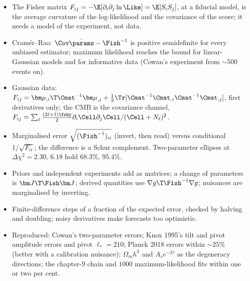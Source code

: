 \begin{recap}
\begin{itemize}
  \item The Fisher matrix $F_{ij}=-\E[\partial_i\partial_j\ln\Like]=\E[S_iS_j]$, at a fiducial model, is the average curvature of the
        log-likelihood and the covariance of the score; it needs a model of the experiment, not data.
  \item Cram\'er--Rao: $\Cov\hat\params-\Fish^{-1}$ is positive semidefinite for every unbiased estimator; maximum likelihood reaches
        the bound for linear-Gaussian models and for informative data (Cowan's experiment from $\sim500$ events on).
  \item Gaussian data: $F_{ij}=\bm\mu_{,i}\T\Cmat^{-1}\bm\mu_{,j}+\frac12\Tr[\Cmat^{-1}\Cmat_{,i}\Cmat^{-1}\Cmat_{,j}]$, first derivatives only; the CMB is the
        covariance channel, $F_{ij}=\sum_\ell\frac{(2\ell+1)\fsky}2\partial_i\Cell\partial_j\Cell/(\Cell+N_\ell)^2$.
  \item Marginalised error $\sqrt{(\Fish^{-1})_{ii}}$ (invert, then read) versus conditional $1/\sqrt{F_{ii}}$; the difference is a Schur
        complement. Two-parameter ellipses at $\Delta\chi^2=2.30,\,6.18$ hold $68.3\%$, $95.4\%$.
  \item Priors and independent experiments add as matrices; a change of parameters is $\bm J\T\Fish\bm J$; derived quantities use
        $\nabla g\T\Fish^{-1}\nabla g$; nuisances are marginalised by inverting.
  \item Finite-difference steps of a fraction of the expected error, checked by halving and doubling; noisy derivatives make
        forecasts too optimistic.
  \item Reproduced: Cowan's two-parameter errors; Knox 1995's tilt and pivot amplitude errors and pivot $\ell_*=210$; Planck 2018
        errors within $\sim25\%$ (better with a calibration nuisance); $\Omega_mh^3$ and $A_se^{-2\tau}$ as the degeneracy directions;
        the chapter-9 chain and $1000$ maximum-likelihood fits within one or two per cent.
\end{itemize}
\end{recap}
\providecommand{\TenBdetRho}{}\renewcommand{\TenBdetRho}{5}
\providecommand{\TenBdetT}{}\renewcommand{\TenBdetT}{16}
\providecommand{\TenBdetfs}{}\renewcommand{\TenBdetfs}{1024}
\providecommand{\TenBdetfhi}{}\renewcommand{\TenBdetfhi}{219.9}
\providecommand{\TenBdetDur}{}\renewcommand{\TenBdetDur}{5.959}
\providecommand{\TenBdetStrainRatio}{}\renewcommand{\TenBdetStrainRatio}{5.314}
